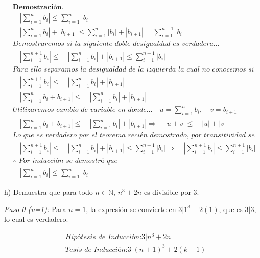 \documentclass{article}
\begin{document}
\begin{align*}
&\textbf{Demostración.} \\
&\quad \left| \sum_{i = 1}^{n} b_i \right| \leq \sum_{i = 1}^{n} |b_i| \\
&\quad \left| \sum_{i = 1}^{n} b_i \right| + |b_{i+1}| \leq \sum_{i = 1}^{n} |b_i| + |b_{i+1}| = \sum_{i = 1}^{n+1} |b_i| \\
&\textit{Demostraremos si la siguiente doble desigualdad es verdadera...} \\
&\quad \left| \sum_{i = 1}^{n+1} b_i \right| \leq \quad \left| \sum_{i = 1}^{n} b_i \right| + |b_{i+1}| \leq \sum_{i = 1}^{n+1} |b_i| \\
&\textit{Para ello separamos la desigualdad de la izquierda la cual no conocemos si se cumpla} \\
&\quad \left| \sum_{i = 1}^{n+1} b_i \right| \leq \quad \left| \sum_{i = 1}^{n} b_i \right| + |b_{i+1}| \\
&\quad \left| \sum_{i = 1}^{n} b_i + b_{i+1} \right| \leq \quad \left| \sum_{i = 1}^{n} b_i \right| + |b_{i+1}| \\
&\textit{Utilizaremos cambio de variable en donde...} \quad u = \sum_{i = 1}^{n} b_i, \quad v = b_{i+1} \\
&\quad \left| \sum_{i = 1}^{n} b_i + b_{i+1} \right| \leq \quad \left| \sum_{i = 1}^{n} b_i \right| + |b_{i+1}| \Rightarrow \quad \left| u + v \right| \leq \quad \left| u \right| + |v| \\
&\textit{Lo que es verdadero por el teorema recién demostrado, por transitividad se infiere...} \\
&\quad \left| \sum_{i = 1}^{n+1} b_i \right| \leq \quad \left| \sum_{i = 1}^{n} b_i \right| + |b_{i+1}| \leq \sum_{i = 1}^{n+1} |b_i|
\Rightarrow \quad \left| \sum_{i = 1}^{n+1} b_i \right| \leq \sum_{i = 1}^{n+1} |b_i| \\
&\therefore \textit{ Por inducción se demostró que } \\
&\quad \left| \sum_{i = 1}^{n} b_i \right| \leq \sum_{i = 1}^{n} |b_i|
\end{align*}
\newpage


  h) Demuestra que para todo \(n\in\mathbb{N}\), \(n^3+2n\) es divisible por 3.

\textit{Paso 0 (n=1):}
Para \(n = 1\), la expresión se convierte en \(3|1^3 + 2(1)\), que es \(3|3\), lo cual es verdadero.
  
\begin{align*}
&\textit{Hipótesis de Inducción:} 3|n^3 + 2n \\
&\textit{Tesis de Inducción:} 3|(n+1)^3 + 2(k+1) \\
\end{align*}
\end{document}
